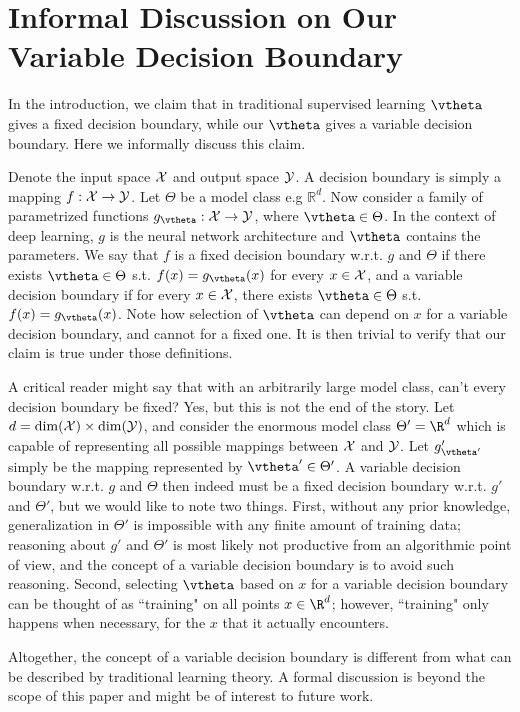 \section{Informal Discussion on Our Variable Decision Boundary}
\label{vdb}
In the introduction, we claim that in traditional supervised learning $\vtheta$ gives a fixed decision boundary, while our $\vtheta$ gives a variable decision boundary. Here we informally discuss this claim.

Denote the input space $\mathcal{X}$ and output space $\mathcal{Y}$. 
A decision boundary is simply a mapping $f: \mathcal{X} \rightarrow \mathcal{Y}$.
Let $\Theta$ be a model class e.g $\mathbb{R}^d$.
Now consider a family of parametrized functions $g_\vtheta: \scrX \rightarrow \scrY$, where $\vtheta\in \Theta$.
In the context of deep learning, $g$ is the neural network architecture and $\vtheta$ contains the parameters. 
We say that $f$ is a fixed decision boundary w.r.t. $g$ and $\Theta$
if there exists $\vtheta\in\Theta$ s.t. $f(x) = g_\vtheta(x)$ for every $x\in\mathcal{X}$,
and a variable decision boundary if for every $x\in\mathcal{X}$, there exists $\vtheta\in\Theta$ s.t. $f(x) = g_\vtheta(x)$.
Note how selection of $\vtheta$ can depend on $x$ for a variable decision boundary, and cannot for a fixed one. It is then trivial to verify that our claim is true under those definitions.

A critical reader might say that with an arbitrarily large model class, can't every decision boundary be fixed?
Yes, but this is not the end of the story.
Let $d = \dim(\mathcal{X}) \times \dim(\mathcal{Y})$, and consider the enormous model class $\Theta' = \R^d$ which is capable of representing all possible mappings between $\mathcal{X}$ and $\mathcal{Y}$.
Let $g'_{\vtheta'}$ simply be the mapping represented by $\vtheta'\in\Theta'$.
A variable decision boundary w.r.t. $g$ and $\Theta$ then indeed must be a fixed decision boundary w.r.t. $g'$ and $\Theta'$, but we would like to note two things.
First, without any prior knowledge, generalization in $\Theta'$ is impossible with any finite amount of training data; 
reasoning about  $g'$ and $\Theta'$ is most likely not productive from an algorithmic point of view, and the concept of a variable decision boundary is to avoid such reasoning.
Second, selecting $\vtheta$ based on $x$ for a variable decision boundary can be thought of as ``training" on all points $x\in\R^d$; however, ``training" only happens when necessary, for the $x$ that it actually encounters. 

Altogether, the concept of a variable decision boundary is different from what can be described
by traditional learning theory. 
A formal discussion is beyond the scope of this paper and might be of interest to future work.

